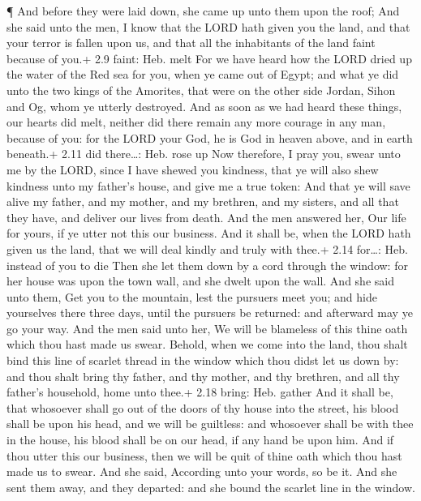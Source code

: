  ¶ And before they were laid down, she came up unto them
upon the roof;  And she said unto the men, I know that the
LORD hath given you the land, and that your terror is fallen upon us,
and that all the inhabitants of the land faint because of you.+ 2.9
faint: Heb. melt  For we have heard how the LORD dried up
the water of the Red sea for you, when ye came out of Egypt; and what ye
did unto the two kings of the Amorites, that were on the other side
Jordan, Sihon and Og, whom ye utterly destroyed.  And as
soon as we had heard these things, our hearts did melt, neither did
there remain any more courage in any man, because of you: for the LORD
your God, he is God in heaven above, and in earth beneath.+ 2.11 did
there\ldots: Heb. rose up  Now therefore, I pray you, swear
unto me by the LORD, since I have shewed you kindness, that ye will also
shew kindness unto my father's house, and give me a true token:
 And that ye will save alive my father, and my mother, and
my brethren, and my sisters, and all that they have, and deliver our
lives from death.  And the men answered her, Our life for
yours, if ye utter not this our business. And it shall be, when the LORD
hath given us the land, that we will deal kindly and truly with thee.+
2.14 for\ldots: Heb. instead of you to die  Then she let
them down by a cord through the window: for her house was upon the town
wall, and she dwelt upon the wall.  And she said unto them,
Get you to the mountain, lest the pursuers meet you; and hide yourselves
there three days, until the pursuers be returned: and afterward may ye
go your way.  And the men said unto her, We will be
blameless of this thine oath which thou hast made us swear.
 Behold, when we come into the land, thou shalt bind this
line of scarlet thread in the window which thou didst let us down by:
and thou shalt bring thy father, and thy mother, and thy brethren, and
all thy father's household, home unto thee.+ 2.18 bring: Heb. gather
 And it shall be, that whosoever shall go out of the doors
of thy house into the street, his blood shall be upon his head, and we
will be guiltless: and whosoever shall be with thee in the house, his
blood shall be on our head, if any hand be upon him.  And
if thou utter this our business, then we will be quit of thine oath
which thou hast made us to swear.  And she said, According
unto your words, so be it. And she sent them away, and they departed:
and she bound the scarlet line in the window.

